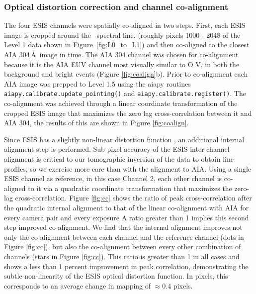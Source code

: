        
\subsubsection{Optical distortion correction and channel co-alignment}
   
   The four ESIS channels were spatially co-aligned in two steps.
First, each ESIS image is cropped around the \ov \ spectral line, (roughly pixels 1000 - 2048 of the Level 1 data shown in Figure~\ref{fig:L0_to_L1}) and then co-aligned to the closest AIA 304\,\AA\ image in time.  
The AIA 304 channel was chosen for co-alignment because it is the AIA EUV channel most visually similar to O V, in both the background and bright events (Figure \ref{fig:coalign}b).
Prior to co-alignment each AIA image was prepped to Level 1.5 using the aiapy routines \texttt{aiapy.calibrate.update\_pointing()} and \texttt{aiapy.calibrate.register()}.
The co-alignment was achieved through a linear coordinate transformation of the cropped ESIS image that maximizes the zero lag cross-correlation between it and AIA 304, the results of this are shown in Figure \ref{fig:coalign}.

Since ESIS has a slightly non-linear distortion function \citep{ESIS}, an additional internal alignment step is performed. 
Sub-pixel accuracy of the ESIS inter-channel alignment is critical to our tomographic inversion of the data to obtain line profiles, so we exercise more care than with the alignment to AIA.
Using a single ESIS channel as reference, in this case Channel 2, each other channel is co-aligned to it via a quadratic coordinate transformation that maximizes the zero-lag cross-correlation. 
Figure \ref{fig:cc} shows the ratio of peak cross-correlation after the quadratic internal alignment to that of the linear co-alignment with AIA for every camera pair and every exposure
A ratio greater than 1 implies this second step improved co-alignment.
We find that the internal alignment improves not only 
the co-alignment between each channel and the reference channel (dots in Figure \ref{fig:cc}), 
but also the co-alignment between every other combination of channels (stars in Figure \ref{fig:cc}).
This ratio is greater than 1 in all cases and shows a less than 1 percent improvement in peak correlation, demonstrating the subtle non-linearity of the ESIS optical distortion function.
In pixels, this corresponds to an average change in mapping of $\approx 0.4$ pixels.


